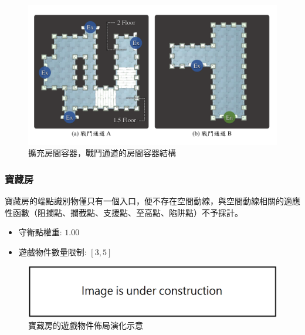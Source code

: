 \begin{figure}[!htb]
  \begin{center}
    \includegraphics[width=1.0\textwidth]{figures/roomtype-mainpath-extend.pdf}
    \caption{擴充房間容器，戰鬥通道的房間容器結構}
    \label{fig:roomtype-mainpath-extend}
  \end{center}
\end{figure}

\subsubsection{寶藏房}
\label{sssec:method-segments-appliedonvolumes-treasure}

寶藏房的端點識別物僅只有一個入口，便不存在空間動線，與空間動線相關的適應性函數（阻攔點、攔截點、支援點、至高點、陷阱點）不予採計。

\begin{itemize}
  \setlength\itemsep{-0.5em}
  \item 守衛點權重: $1.00$
  \item 遊戲物件數量限制: $[3, 5]$
\end{itemize}

\begin{figure}[!htb]
  \begin{center}
    \includegraphics[width=1.0\textwidth]{figures/under_construction.png}
    \caption{寶藏房的遊戲物件佈局演化示意} 
    \label{fig:applied-ga-on-volume-treasure}
  \end{center}
\end{figure}

